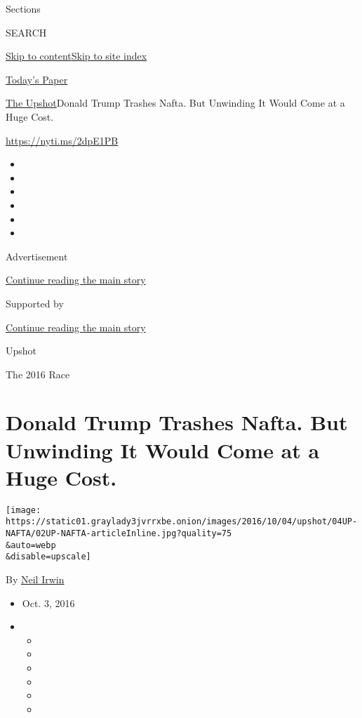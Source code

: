 Sections

SEARCH

\protect\hyperlink{site-content}{Skip to
content}\protect\hyperlink{site-index}{Skip to site index}

\href{https://myaccount.nytimes3xbfgragh.onion/auth/login?response_type=cookie\&client_id=vi}{}

\href{https://www.nytimes3xbfgragh.onion/section/todayspaper}{Today's
Paper}

\href{/section/upshot}{The Upshot}\textbar{}Donald Trump Trashes Nafta.
But Unwinding It Would Come at a Huge Cost.

\url{https://nyti.ms/2dpE1PB}

\begin{itemize}
\item
\item
\item
\item
\item
\item
\end{itemize}

Advertisement

\protect\hyperlink{after-top}{Continue reading the main story}

Supported by

\protect\hyperlink{after-sponsor}{Continue reading the main story}

Upshot

The 2016 Race

\hypertarget{donald-trump-trashes-nafta-but-unwinding-it-would-come-at-a-huge-cost}{%
\section{Donald Trump Trashes Nafta. But Unwinding It Would Come at a
Huge
Cost.}\label{donald-trump-trashes-nafta-but-unwinding-it-would-come-at-a-huge-cost}}

\texttt{[image: https://static01.graylady3jvrrxbe.onion/images/2016/10/04/upshot/04UP-NAFTA/02UP-NAFTA-articleInline.jpg?quality=75\\\&auto=webp\\\&disable=upscale]}

By \href{http://www.nytimes3xbfgragh.onion/by/neil-irwin}{Neil Irwin}

\begin{itemize}
\item
  Oct. 3, 2016
\item
  \begin{itemize}
  \item
  \item
  \item
  \item
  \item
  \item
  \end{itemize}
\end{itemize}

